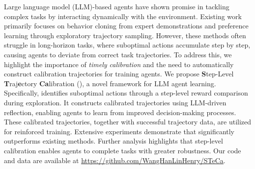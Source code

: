 Large language model (LLM)-based agents have shown promise in tackling complex tasks by interacting dynamically with the environment. 
Existing work primarily focuses on behavior cloning from expert demonstrations and preference learning through exploratory trajectory sampling. However, these methods often struggle in long-horizon tasks, where suboptimal actions accumulate step by step, causing agents to deviate from correct task trajectories.
To address this, we highlight the importance of \textit{timely calibration} and the need to automatically construct calibration trajectories for training agents. We propose \textbf{S}tep-Level \textbf{T}raj\textbf{e}ctory \textbf{Ca}libration (\textbf{\model}), a novel framework for LLM agent learning. 
Specifically, \model identifies suboptimal actions through a step-level reward comparison during exploration. It constructs calibrated trajectories using LLM-driven reflection, enabling agents to learn from improved decision-making processes. These calibrated trajectories, together with successful trajectory data, are utilized for reinforced training.
Extensive experiments demonstrate that \model significantly outperforms existing methods. Further analysis highlights that step-level calibration enables agents to complete tasks with greater robustness. 
Our code and data are available at \url{https://github.com/WangHanLinHenry/STeCa}.